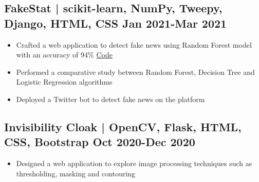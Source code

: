 \documentclass[10pt]{article}
\newenvironment{zitemize}{
\begin{itemize}\itemsep2pt \parskip0pt \parsep1pt}
{\end{itemize}\vspace{-0.7cm}}
\begin{document}
\subsection*{FakeStat | \normalfont{} \normalsize scikit-learn, NumPy, Tweepy, Django, HTML, CSS \hfill \textbf{Jan 2021-Mar 2021}}
    \begin{zitemize}
        \item Crafted a web application  to detect fake news using Random Forest model with an accuracy of 94\% \hfill \href{https://github.com/mihikagaonkar/FakeStat}{Code}
        \item Performed a comparative study between Random Forest, Decision Tree and Logistic Regression algorithms
        \item Deployed a Twitter bot to detect fake news on the platform
    
    \end{zitemize}
        \vspace{0.1cm}
\subsection*{Invisibility Cloak | \normalfont{} \normalsize OpenCV, Flask, HTML, CSS, Bootstrap \hfill \textbf{Oct 2020-Dec 2020}}
    \begin{zitemize}
        \item Designed a web application to explore image processing techniques such as thresholding, masking and contouring
        
    \end{zitemize}
\end{document}
